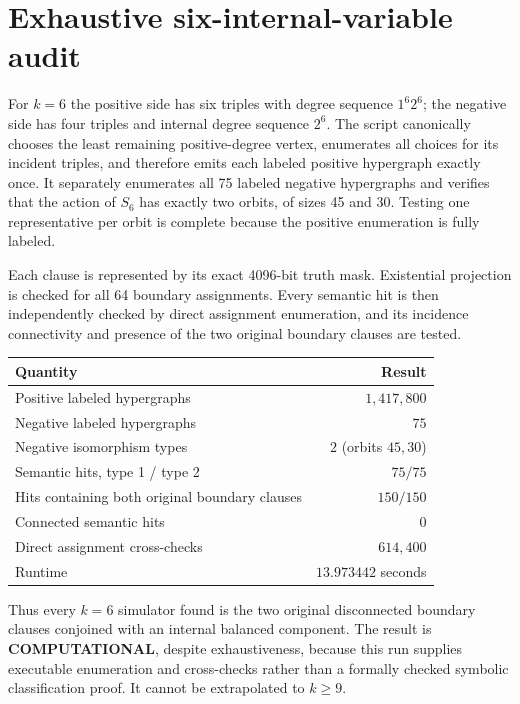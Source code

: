 \documentclass[11pt]{article}
\newcommand{\COMP}{\textbf{COMPUTATIONAL}}
\begin{document}
\section{Exhaustive six-internal-variable audit}

For $k=6$ the positive side has six triples with degree sequence
$1^6 2^6$; the negative side has four triples and internal degree sequence
$2^6$.  The script canonically chooses the least remaining positive-degree
vertex, enumerates all choices for its incident triples, and therefore emits
each labeled positive hypergraph exactly once.  It separately enumerates all
75 labeled negative hypergraphs and verifies that the action of $S_6$ has
exactly two orbits, of sizes 45 and 30.  Testing one representative per orbit
is complete because the positive enumeration is fully labeled.

Each clause is represented by its exact 4096-bit truth mask.  Existential
projection is checked for all 64 boundary assignments.  Every semantic hit
is then independently checked by direct assignment enumeration, and its
incidence connectivity and presence of the two original boundary clauses are
tested.

\begin{center}
\begin{tabular}{lr}
\toprule
Quantity & Result\\
\midrule
Positive labeled hypergraphs & $1{,}417{,}800$\\
Negative labeled hypergraphs & $75$\\
Negative isomorphism types & $2$ (orbits $45,30$)\\
Semantic hits, type 1 / type 2 & $75/75$\\
Hits containing both original boundary clauses & $150/150$\\
Connected semantic hits & $0$\\
Direct assignment cross-checks & $614{,}400$\\
Runtime & $13.973442$ seconds\\
\bottomrule
\end{tabular}
\end{center}

Thus every $k=6$ simulator found is the two original disconnected boundary
clauses conjoined with an internal balanced component.  The result is
\COMP, despite exhaustiveness, because this run supplies executable
enumeration and cross-checks rather than a formally checked symbolic
classification proof.  It cannot be extrapolated to $k\ge9$.
\end{document}
